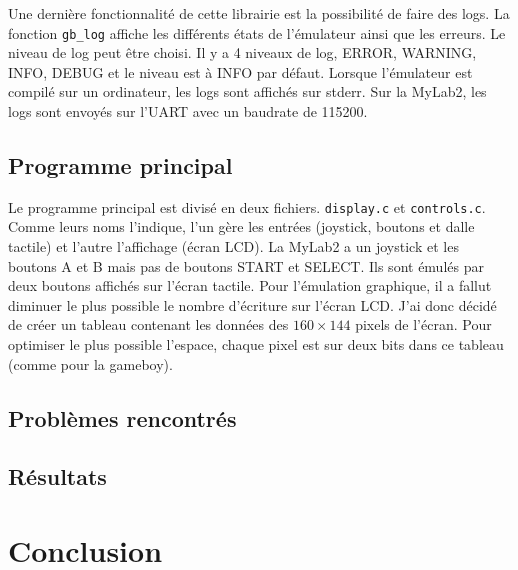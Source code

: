 \documentclass[a4paper]{article}
\begin{document}
Une dernière fonctionnalité de cette librairie est la possibilité de faire des logs.
La fonction \texttt{gb_log} affiche les différents états de l'émulateur
ainsi que les erreurs. Le niveau de log peut être choisi. Il y a 4 niveaux de log,
ERROR, WARNING, INFO, DEBUG et le niveau est à INFO par défaut. Lorsque l'émulateur
est compilé sur un ordinateur, les logs sont affichés sur stderr. Sur la MyLab2,
les logs sont envoyés sur l'UART avec un baudrate de 115200.

\subsection{Programme principal}
Le programme principal est divisé en deux fichiers. \texttt{display.c}
et \texttt{controls.c}. Comme leurs noms l'indique, l'un gère les entrées
(joystick, boutons et dalle tactile) et l'autre l'affichage (écran LCD).
La MyLab2 a un joystick et les boutons A et B mais pas de boutons START et SELECT.
Ils sont émulés par deux boutons affichés sur l'écran tactile. Pour l'émulation graphique,
il a fallut diminuer le plus possible le nombre d'écriture sur l'écran LCD. J'ai
donc décidé de créer un tableau contenant les données des $160 \times 144$ pixels
de l'écran. Pour optimiser le plus possible l'espace, chaque pixel est sur deux bits
dans ce tableau (comme pour la gameboy).

\subsection{Problèmes rencontrés}

\subsection{Résultats}

\newpage


\section{Conclusion}
\end{document}
